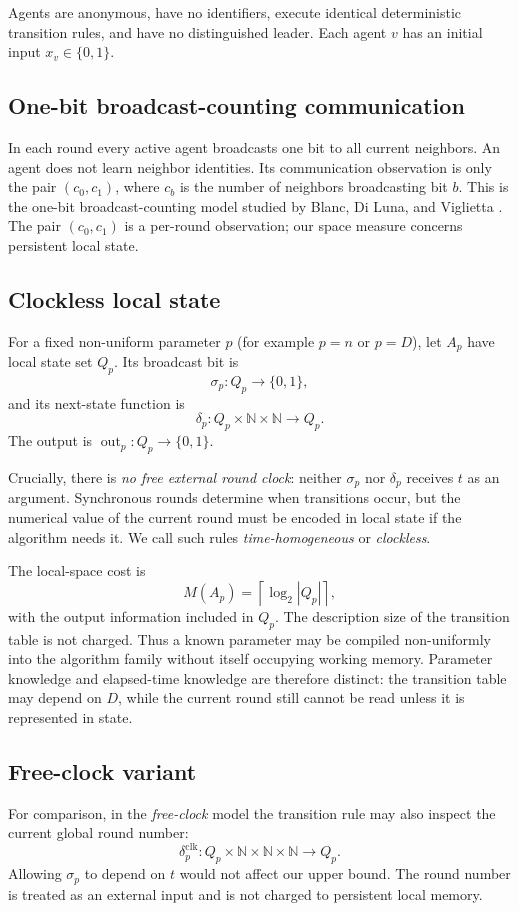 \documentclass[11pt]{article}
\theoremstyle{remark}
\begin{document}
Agents are anonymous, have no identifiers, execute identical deterministic transition rules, and have no distinguished leader. Each agent $v$ has an initial input $x_v\in\{0,1\}$.

\subsection{One-bit broadcast-counting communication}
In each round every active agent broadcasts one bit to all current neighbors. An agent does not learn neighbor identities. Its communication observation is only the pair $(c_0,c_1)$, where $c_b$ is the number of neighbors broadcasting bit $b$. This is the one-bit broadcast-counting model studied by Blanc, Di Luna, and Viglietta \cite{blanc2026onebit}. The pair $(c_0,c_1)$ is a per-round observation; our space measure concerns persistent local state.

\subsection{Clockless local state}
For a fixed non-uniform parameter $p$ (for example $p=n$ or $p=D$), let $A_p$ have local state set $Q_p$. Its broadcast bit is
\[
\sigma_p:Q_p\to\{0,1\},
\]
and its next-state function is
\[
\delta_p:Q_p\times\mathbb N\times\mathbb N\to Q_p.
\]
The output is $\operatorname{out}_p:Q_p\to\{0,1\}$.

Crucially, there is \emph{no free external round clock}: neither $\sigma_p$ nor $\delta_p$ receives $t$ as an argument. Synchronous rounds determine when transitions occur, but the numerical value of the current round must be encoded in local state if the algorithm needs it. We call such rules \emph{time-homogeneous} or \emph{clockless}.

The local-space cost is
\[
M(A_p)=\left\lceil\log_2|Q_p|\right\rceil,
\]
with the output information included in $Q_p$. The description size of the transition table is not charged. Thus a known parameter may be compiled non-uniformly into the algorithm family without itself occupying working memory. Parameter knowledge and elapsed-time knowledge are therefore distinct: the transition table may depend on $D$, while the current round still cannot be read unless it is represented in state.

\subsection{Free-clock variant}
For comparison, in the \emph{free-clock} model the transition rule may also inspect the current global round number:
\[
\delta^{\mathrm{clk}}_p:Q_p\times\mathbb N\times\mathbb N\times\mathbb N\to Q_p.
\]
Allowing $\sigma_p$ to depend on $t$ would not affect our upper bound. The round number is treated as an external input and is not charged to persistent local memory.
\end{document}
